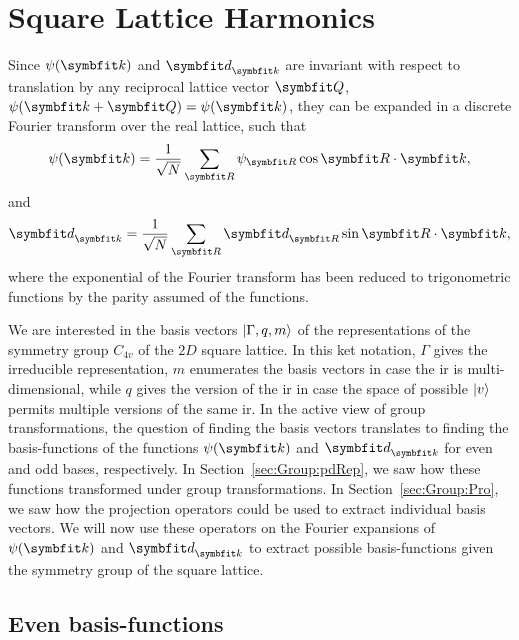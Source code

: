 \section{Square Lattice Harmonics}

Since $\psi(\v{k})$ and $\v{d}_\v{k}$ are invariant with respect to translation by any reciprocal lattice vector $\v{Q}$, $\psi(\v{k}+\v{Q}) = \psi(\v{k})$,
they can be expanded in a discrete Fourier transform over the real lattice, such that
\begin{equation}
    \label{eq:Group:SLH:psiFourier}
    \psi(\v{k}) = \frac{1}{\sqrt{N}}\sum_\v{R}\psi_\v{R}\cos\v{R}\cdot\v{k},
\end{equation}
and
\begin{equation}
    \label{eq:Group:SLH:dFourier}
    \v{d}_\v{k} = \frac{1}{\sqrt{N}}\sum_\v{R}\v{d}_\v{R}\sin\v{R}\cdot\v{k},
\end{equation}
where the exponential of the Fourier transform has been reduced to trigonometric functions by the parity assumed of the functions.

We are interested in the basis vectors $\lvert \Gamma,q,m \rangle$ of the representations of the symmetry group $C_{4v}$ of the $2D$ square lattice. In this
ket notation, $\Gamma$ gives the irreducible representation, $m$ enumerates the basis vectors in case the \ac{ir} is multi-dimensional, while $q$ gives the version of
the \ac{ir} in case the space of possible $\lvert v \rangle$ permits multiple versions of the same \ac{ir}. In the active
view of group transformations, the question of finding the basis vectors translates to finding the basis-functions of the functions $\psi(\v{k})$
and $\v{d}_\v{k}$ for even and odd bases, respectively. In Section~\ref{sec:Group:pdRep}, we
saw how these functions transformed under group transformations. In Section~\ref{sec:Group:Pro}, we saw how the projection operators could be used
to extract individual basis vectors. We will now use these operators on the Fourier expansions of $\psi(\v{k})$ and $\v{d}_\v{k}$ to extract possible
basis-functions given the symmetry group of the square lattice.

\subsection{Even basis-functions}

